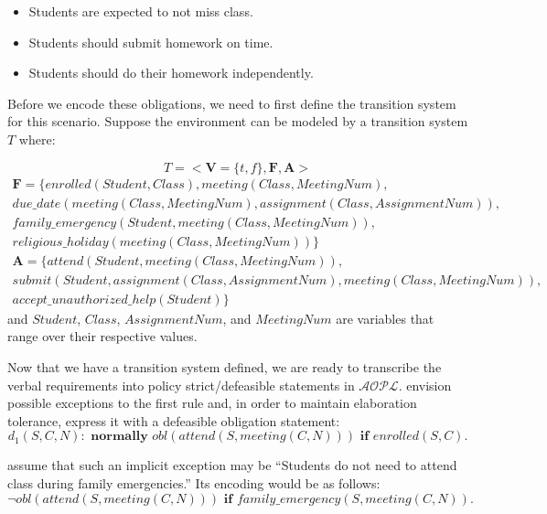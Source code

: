 \begin{itemize}
    \item Students are expected to not miss class.
    \item Students should submit homework on time.
    \item Students should do their homework independently.
\end{itemize}

Before we encode these obligations, we need to first define the transition system for this scenario.
Suppose the environment can be modeled by a transition system $T$ where:

\begin{equation}
    T=<\boldsymbol{V}=\{t,f\}, \boldsymbol{F}, \boldsymbol{A}>
\end{equation}
\begin{multline}
    \boldsymbol{F} = \{enrolled(Student, Class), meeting(Class, MeetingNum), \\
        due\_date(meeting(Class, MeetingNum), assignment(Class, AssignmentNum)), \\
        family\_emergency(Student, meeting(Class, MeetingNum)), \\
        religious\_holiday(meeting(Class, MeetingNum))\}
\end{multline}
\begin{multline}
    \boldsymbol{A} = \{attend(Student, meeting(Class, MeetingNum)), \\
        submit(Student, assignment(Class, AssignmentNum), meeting(Class, MeetingNum)), \\
        accept\_unauthorized\_help(Student)\}
\end{multline}
and $Student$, $Class$, $AssignmentNum$, and $MeetingNum$ are variables that range over their respective values.

Now that we have a transition system defined, we are ready to transcribe the verbal requirements into policy strict/defeasible statements in $\mathcal{AOPL}$.
\citet{gelfond_authorization_2008} envision possible exceptions to the first rule and, in order to maintain elaboration tolerance, express it with a defeasible obligation statement:
\begin{equation}
    \label{eq:aopl_example_line_1}
    d_1(S,C,N): \textbf{ normally } obl(attend(S, meeting(C, N))) \textbf{ if } enrolled(S, C).
\end{equation}

\citet{gelfond_authorization_2008} assume that such an implicit exception may be ``Students do not need to attend class during family emergencies.''
Its encoding would be as follows:
\begin{equation}
    \label{eq:aopl_example_line_2}
    \neg obl(attend(S,meeting(C, N))) \textbf{ if } family\_emergency(S,meeting(C, N)).
\end{equation}

